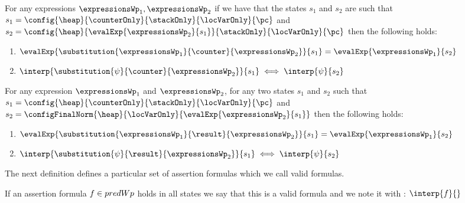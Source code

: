\begin{substCntr}\label{substCntr}
For any expressions $ \expressionsWp_1, \expressionsWp_2 $ 
if we have that the states $s_1$ and $s_2$ are such that
 $s_1 =   \config{\heap}{\counterOnly}{ \stackOnly }{\locVarOnly}{\pc }$ and 
$s_2 =  \config{\heap}{\evalExp{ \expressionsWp_2}{ s_1  } }{ \stackOnly }{\locVarOnly}{\pc }  $ then 
the following holds:
\begin{enumerate}
      \item $\evalExp{\substitution{\expressionsWp_1}{ \counter }{ \expressionsWp_2 }}{ s_1 } = \evalExp{\expressionsWp_1}{s_2} $
      \item $\interp{\substitution{\psi}{ \counter }{ \expressionsWp_2 }}{ s_1 } \iff \interp{\psi}{s_2} $
\end{enumerate}
\end{substCntr} 




\begin{substRet}\label{substRet} 
For any expression $\expressionsWp_1$ and $\expressionsWp_2$,
for any two states $s_1$ and $s_2$  such that
$ s_1 =   \config{\heap}{\counterOnly}{ \stackOnly }{\locVarOnly}{\pc }$ and \\
$ s_2 =   \configFinalNorm{\heap}{\locVarOnly}{\evalExp{\expressionsWp_2}{s_1} } $ then 
the following holds:
\begin{enumerate}
      \item $\evalExp{\substitution{\expressionsWp_1}{ \result }{ \expressionsWp_2 }}{ s_1 } = \evalExp{\expressionsWp_1}{s_2} $
      \item $\interp{\substitution{\psi}{ \result}{ \expressionsWp_2 }}{ s_1 } \iff \interp{\psi}{s_2} $
\end{enumerate}
\end{substRet}


The next definition defines a particular set of assertion formulas which we call valid formulas.
\begin{valid}
  If an assertion formula  $ f \in \\predWp $ holds in all states we say that this is a valid formula and we note it with :
  $ \interp{f}{}$
\end{valid}




